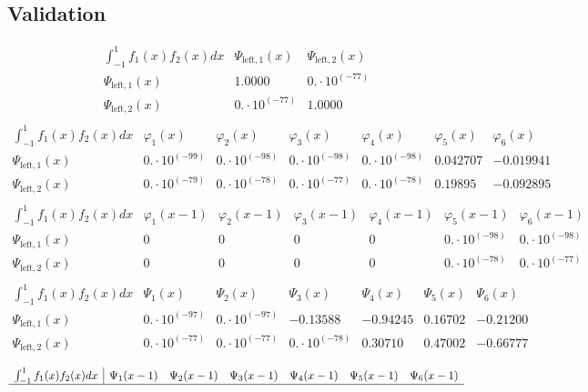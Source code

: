 \documentclass{article}
\begin{document}
 \begin{landscape}
 \subsection{Validation}$$ \begin{array}{l|ll}
\int_{-1}^1 f_1(x)f_2(x) dx& \Psi_{\text{left},1}(x)& \Psi_{\text{left},2}(x) \\ \hline 
 \Psi_{\text{left},1}(x) & 1.0000 & 0.\cdot 10^{(-77)} \\ 
\Psi_{\text{left},2}(x) & 0.\cdot 10^{(-77)} & 1.0000 \\ 
\end{array} $$
$$ \begin{array}{l|llllll}
\int_{-1}^1 f_1(x)f_2(x) dx& \varphi_1(x)& \varphi_2(x)& \varphi_3(x)& \varphi_4(x)& \varphi_5(x)& \varphi_6(x) \\ \hline 
 \Psi_{\text{left},1}(x) & 0.\cdot 10^{(-99)} & 0.\cdot 10^{(-98)} & 0.\cdot 10^{(-98)} & 0.\cdot 10^{(-98)} & 0.042707 & -0.019941 \\ 
\Psi_{\text{left},2}(x) & 0.\cdot 10^{(-79)} & 0.\cdot 10^{(-78)} & 0.\cdot 10^{(-77)} & 0.\cdot 10^{(-78)} & 0.19895 & -0.092895 \\ 
\end{array} $$ 
$$ \begin{array}{l|llllll}
\int_{-1}^1 f_1(x)f_2(x) dx& \varphi_1(x-1)& \varphi_2(x-1)& \varphi_3(x-1)& \varphi_4(x-1)& \varphi_5(x-1)& \varphi_6(x-1) \\ \hline 
 \Psi_{\text{left},1}(x) & 0 & 0 & 0 & 0 & 0.\cdot 10^{(-98)} & 0.\cdot 10^{(-98)} \\ 
\Psi_{\text{left},2}(x) & 0 & 0 & 0 & 0 & 0.\cdot 10^{(-78)} & 0.\cdot 10^{(-77)} \\ 
\end{array} $$ 
$$ \begin{array}{l|llllll}
\int_{-1}^1 f_1(x)f_2(x) dx& \Psi_1(x)& \Psi_2(x)& \Psi_3(x)& \Psi_4(x)& \Psi_5(x)& \Psi_6(x) \\ \hline 
 \Psi_{\text{left},1}(x) & 0.\cdot 10^{(-97)} & 0.\cdot 10^{(-97)} & -0.13588 & -0.94245 & 0.16702 & -0.21200 \\ 
\Psi_{\text{left},2}(x) & 0.\cdot 10^{(-77)} & 0.\cdot 10^{(-77)} & 0.\cdot 10^{(-78)} & 0.30710 & 0.47002 & -0.66777 \\ 
\end{array} $$ 
$$ \begin{array}{l|llllll}
\int_{-1}^1 f_1(x)f_2(x) dx& \Psi_1(x-1)& \Psi_2(x-1)& \Psi_3(x-1)& \Psi_4(x-1)& \Psi_5(x-1)& \Psi_6(x-1) \\ \hline 

\end{array}$$
\end{landscape}
\end{document}
